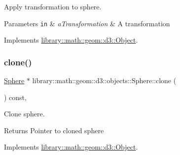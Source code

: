 Apply transformation to sphere. 


\begin{DoxyParams}[1]{Parameters}
\mbox{\tt in}  & {\em a\+Transformation} & A transformation \\
\hline
\end{DoxyParams}


Implements \hyperlink{classlibrary_1_1math_1_1geom_1_1d3_1_1_object_a5fc47b1ee5d9a28efc6010d3d1512470}{library\+::math\+::geom\+::d3\+::\+Object}.

\mbox{\label{classlibrary_1_1math_1_1geom_1_1d3_1_1objects_1_1_sphere_a58370a8ff15b7c5a48cf4ffec5be3015}} 
\subsubsection{\texorpdfstring{clone()}{clone()}}
{\footnotesize\ttfamily \hyperlink{classlibrary_1_1math_1_1geom_1_1d3_1_1objects_1_1_sphere}{Sphere} $\ast$ library\+::math\+::geom\+::d3\+::objects\+::\+Sphere\+::clone (\begin{DoxyParamCaption}{ }\end{DoxyParamCaption}) const\hspace{0.3cm}{\ttfamily [override]}, {\ttfamily [virtual]}}



Clone sphere. 

\begin{DoxyReturn}{Returns}
Pointer to cloned sphere 
\end{DoxyReturn}


Implements \hyperlink{classlibrary_1_1math_1_1geom_1_1d3_1_1_object_a1a784c6b359e0eb97cd34fabc42f2f3f}{library\+::math\+::geom\+::d3\+::\+Object}.

\mbox{\label{classlibrary_1_1math_1_1geom_1_1d3_1_1objects_1_1_sphere_a2780e2754d206379fbe2cdc06b799a2e}} 
